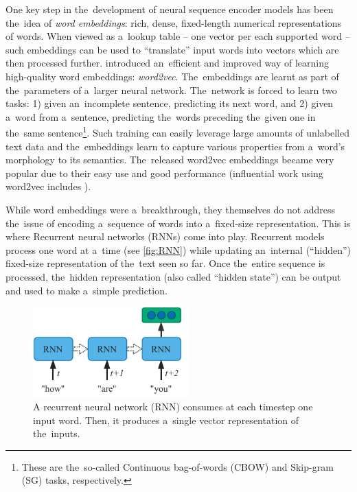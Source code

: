 \documentclass[bsc,frontabs,singlespacing,parskip,deptreport]{infthesis}
\begin{document}
{{    One key step in the~development of neural sequence encoder models has been the~idea of \textit{word embeddings}: rich, dense, fixed-length numerical representations of words. When viewed as a~lookup table -- one vector per each supported word -- such embeddings can be used to ``translate'' input words into vectors which are then processed further.
    \citet{Mikolov_2013} introduced an~efficient and improved way of learning high-quality word embeddings: \textit{word2vec}. The~embeddings are learnt as part of the~parameters of a~larger neural network. The~network is forced to learn two tasks: 1) given an~incomplete sentence, predicting its next word, and 2) given a~word from a~sentence, predicting the~words preceding the~given one in the~same sentence\footnote{These are the~so-called Continuous bag-of-words (CBOW) and Skip-gram (SG) tasks, respectively.}. Such training can easily leverage large amounts of unlabelled text data and the~embeddings learn to capture various properties from a~word's morphology to its semantics. The~released word2vec embeddings became very popular due to their easy use and good performance (influential work using word2vec includes \citet{Lample_2016,Kiros_2015,Dos_2014,Kusner_2015}).

    While word embeddings were a~breakthrough, they themselves do not address the~issue of encoding a~sequence of words into a~fixed-size representation. This is where Recurrent neural networks (RNNs) \citep{Rumelhart_1986} come into play.
    Recurrent models process one word at a~time (see \autoref{fig:RNN}) while updating an~internal (``hidden'') fixed-size representation of the~text seen so far.
    Once the~entire sequence is processed, the~hidden representation (also called ``hidden state'') can be output and used to make a~simple prediction.
    \begin{figure}[h!t]
      \centering
      \includegraphics[width=6cm]{graphics/rnn}
      \caption{A recurrent neural network (RNN) consumes at each timestep one input word. Then, it produces a~single vector representation of the~inputs.}
      \label{fig:RNN}
    \end{figure}

}}
\end{document}
